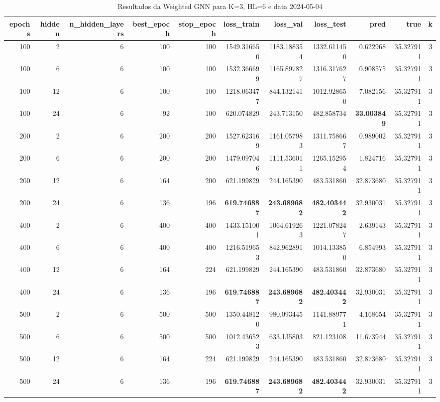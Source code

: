 \begin{table}
\caption{Resultados da Weighted GNN para K=3, HL=6 e data 2024-05-04}
\label{tab:weighted_gnn_results_k3_hl6_d20240504}
\begin{tabular}{rrrrrrrrrrr}
\toprule
epochs & hidden & n\_hidden\_layers & best\_epoch & stop\_epoch & loss\_train & loss\_val & loss\_test & pred & true & k \\
\midrule
100 & 2 & 6 & 100 & 100 & 1549.316650 & 1183.188354 & 1332.611450 & 0.622968 & 35.327911 & 3 \\
100 & 6 & 6 & 100 & 100 & 1532.366699 & 1165.897827 & 1316.317627 & 0.908575 & 35.327911 & 3 \\
100 & 12 & 6 & 100 & 100 & 1218.063477 & 844.132141 & 1012.928650 & 7.082156 & 35.327911 & 3 \\
100 & 24 & 6 & 92 & 100 & 620.074829 & 243.713150 & 482.858734 & \textbf{33.003849} & 35.327911 & 3 \\
200 & 2 & 6 & 200 & 200 & 1527.623169 & 1161.057983 & 1311.758667 & 0.989002 & 35.327911 & 3 \\
200 & 6 & 6 & 200 & 200 & 1479.097046 & 1111.536011 & 1265.152954 & 1.824716 & 35.327911 & 3 \\
200 & 12 & 6 & 164 & 200 & 621.199829 & 244.165390 & 483.531860 & 32.873680 & 35.327911 & 3 \\
200 & 24 & 6 & 136 & 196 & \textbf{619.746887} & \textbf{243.689682} & \textbf{482.403442} & 32.930031 & 35.327911 & 3 \\
400 & 2 & 6 & 400 & 400 & 1433.151001 & 1064.619263 & 1221.078247 & 2.639143 & 35.327911 & 3 \\
400 & 6 & 6 & 400 & 400 & 1216.519653 & 842.962891 & 1014.133850 & 6.854993 & 35.327911 & 3 \\
400 & 12 & 6 & 164 & 224 & 621.199829 & 244.165390 & 483.531860 & 32.873680 & 35.327911 & 3 \\
400 & 24 & 6 & 136 & 196 & \textbf{619.746887} & \textbf{243.689682} & \textbf{482.403442} & 32.930031 & 35.327911 & 3 \\
500 & 2 & 6 & 500 & 500 & 1350.448120 & 980.093445 & 1141.889771 & 4.168654 & 35.327911 & 3 \\
500 & 6 & 6 & 500 & 500 & 1012.436523 & 633.135803 & 821.123108 & 11.673944 & 35.327911 & 3 \\
500 & 12 & 6 & 164 & 224 & 621.199829 & 244.165390 & 483.531860 & 32.873680 & 35.327911 & 3 \\
500 & 24 & 6 & 136 & 196 & \textbf{619.746887} & \textbf{243.689682} & \textbf{482.403442} & 32.930031 & 35.327911 & 3 \\

\end{tabular}
\end{table}
